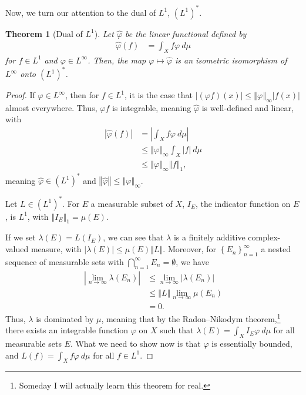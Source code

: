 \documentclass[12pt]{extarticle}
\newcommand{\norm}[1]{\left\Vert #1\right\Vert}
\newcommand{\set}[1]{\left\{#1\right\}}
\theoremstyle{plain}
\newtheorem*{theorem}{Theorem}
\theoremstyle{definition}
\theoremstyle{note}
\renewcommand{\newline}{\hfill\break}
\begin{document}
Now, we turn our attention to the dual of $L^{1}$, $\left(L^{1}\right)^{\ast}$.
\begin{theorem}[Dual of $L^{1}$]
  Let $\hat{\varphi}$ be the linear functional defined by
  \begin{align*}
    \hat{\varphi}(f) &= \int_{X}^{} f\varphi\:d\mu
  \end{align*}
  for $f\in L^{1}$ and $\varphi \in L^{\infty}$. Then, the map $\varphi \mapsto \hat\varphi$ is an isometric isomorphism of $L^{\infty}$ onto $\left(L^{1}\right)^{\ast}$.
\end{theorem}
\begin{proof}
  If $\varphi \in L^{\infty}$, then for $f\in L^{1}$, it is the case that $\left\vert (\varphi f)(x) \right\vert \leq \norm{\varphi}_{\infty}\left\vert f(x) \right\vert$ almost everywhere. Thus, $\varphi f$ is integrable, meaning $\hat{\varphi}$ is well-defined and linear, with
  \begin{align*}
    \left\vert \hat{\varphi}(f) \right\vert &= \left\vert \int_{X}^{} f\varphi\:d\mu \right\vert\\
                                            &\leq \norm{\varphi}_{\infty}\int_{X}^{} |f|\:d\mu\\
                                            &\leq \norm{\varphi}_{\infty}\norm{f}_{1},
  \end{align*}
  meaning $\hat{\varphi}\in \left(L^{1}\right)^{\ast}$ and $\norm{\hat{\varphi}}\leq \norm{\varphi}_{\infty}$.\newline

  Let $L\in \left(L^{1}\right)^{\ast}$. For $E$ a measurable subset of $X$, $I_{E}$, the indicator function on $E$, is $L^{1}$, with $\norm{I_{E}}_{1} = \mu(E)$.\newline

  If we set $\lambda(E) = L(I_E)$, we can see that $\lambda$ is a finitely additive complex-valued measure, with $\left\vert \lambda(E) \right\vert\leq \mu(E) \norm{L}$. Moreover, for $\set{E_n}_{n=1}^{\infty}$ a nested sequence of measurable sets with $\bigcap_{n=1}^{\infty} E_n = \emptyset$, we have
  \begin{align*}
    \left\vert \lim_{n\rightarrow\infty}\lambda\left(E_n\right) \right\vert &\leq \lim_{n\rightarrow\infty}\left\vert \lambda\left(E_n\right) \right\vert\\
                                                                            &\leq \norm{L}\lim_{n\rightarrow\infty}\mu\left(E_n\right)\\
                                                                            &= 0.
  \end{align*}
  Thus, $\lambda$ is dominated by $\mu$, meaning that by the Radon--Nikodym theorem,\footnote{Someday I will actually learn this theorem for real.} there exists an integrable function $\varphi$ on $X$ such that $\lambda(E) = \int_{X}I_E\varphi \: d\mu$ for all measurable sets $E$. What we need to show now is that $\varphi$ is essentially bounded, and $L(f) = \int_{X}f\varphi\:d\mu$ for all $f\in L^1$.\newline


\end{proof}
\end{document}
